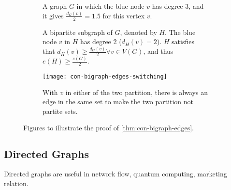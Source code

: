 \documentclass[../src/handouts/main.tex]{subfiles}
\begin{document}
\begin{figure}[htbp]
  \centering
  \begin{subfigure}[t]{.4\textwidth}
    \centering
    \caption{A graph $G$ in which the blue node $v$ has degree 3, and it gives $\frac{d_G(v)}{2} = 1.5$ for this vertex $v$.}
    \label{fig:con-bigraph-edges-original}
  \end{subfigure}
  \hspace{.15\textwidth}
  \begin{subfigure}[t]{.4\textwidth}
    \centering
    \caption{A bipartite subgraph of $G$, denoted by $H$. The blue node $v$ in $H$ has degree 2 ($d_H(v) = 2$). $H$ satisfies that $d_H(v) \geq \frac{d_G(v)}{2} \forall v \in V(G)$, and thus $e(H) \geq \frac{e(G)}{2}$.}
    \label{fig:con-bigraph-edges-subgraph}
  \end{subfigure}

  \vspace{1em}

  \begin{subfigure}[t]{.75\textwidth}
    \centering
    \texttt{[image: con-bigraph-edges-switching]}
    \caption{With $v$ in either of the two partition, there is always an edge in the same set to make the two partition not partite sets.}
    \label{fig:con-bigraph-edges-switching}
  \end{subfigure}
  \caption{Figures to illustrate the proof of \cref{thm:con-bigraph-edges}.}
  \label{fig:con-bigraph-edges}
\end{figure}



\subsection{Directed Graphs}

Directed graphs are useful in network flow, quantum computing, marketing relation.
\end{document}
